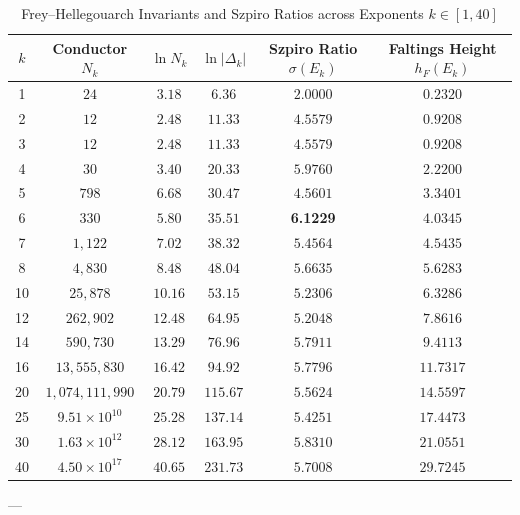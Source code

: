 \documentclass[11pt,reqno]{amsart}
\theoremstyle{definition}
\numberwithin{equation}{section}
\begin{document}
\begin{table}[ht]
\centering
\caption{Frey--Hellegouarch Invariants and Szpiro Ratios across Exponents $k \in [1, 40]$}
\label{tab:frey_spectrum}
\begin{tabular}{@{}cccccc@{}}
\toprule
$k$ & Conductor $N_k$ & $\ln N_k$ & $\ln|\Delta_k|$ & Szpiro Ratio $\sigma(E_k)$ & Faltings Height $h_F(E_k)$ \\ \midrule
1 & $24$ & $3.18$ & $6.36$ & $2.0000$ & $0.2320$ \\
2 & $12$ & $2.48$ & $11.33$ & $4.5579$ & $0.9208$ \\
3 & $12$ & $2.48$ & $11.33$ & $4.5579$ & $0.9208$ \\
4 & $30$ & $3.40$ & $20.33$ & $5.9760$ & $2.2200$ \\
5 & $798$ & $6.68$ & $30.47$ & $4.5601$ & $3.3401$ \\
6 & $330$ & $5.80$ & $35.51$ & \textbf{6.1229} & $4.0345$ \\
7 & $1{,}122$ & $7.02$ & $38.32$ & $5.4564$ & $4.5435$ \\
8 & $4{,}830$ & $8.48$ & $48.04$ & $5.6635$ & $5.6283$ \\
10 & $25{,}878$ & $10.16$ & $53.15$ & $5.2306$ & $6.3286$ \\
12 & $262{,}902$ & $12.48$ & $64.95$ & $5.2048$ & $7.8616$ \\
14 & $590{,}730$ & $13.29$ & $76.96$ & $5.7911$ & $9.4113$ \\
16 & $13{,}555{,}830$ & $16.42$ & $94.92$ & $5.7796$ & $11.7317$ \\
20 & $1{,}074{,}111{,}990$ & $20.79$ & $115.67$ & $5.5624$ & $14.5597$ \\
25 & $9.51 \times 10^{10}$ & $25.28$ & $137.14$ & $5.4251$ & $17.4473$ \\
30 & $1.63 \times 10^{12}$ & $28.12$ & $163.95$ & $5.8310$ & $21.0551$ \\
40 & $4.50 \times 10^{17}$ & $40.65$ & $231.73$ & $5.7008$ & $29.7245$ \\ \bottomrule
\end{tabular}
\end{table}

---
\end{document}
